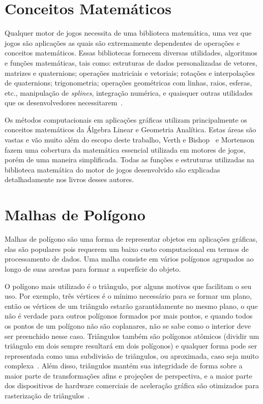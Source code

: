 \section{Conceitos Matemáticos}
\label{secmathconcepts}

Qualquer motor de jogos necessita de uma biblioteca matemática, uma vez que 
jogos são aplicações as quais são extremamente dependentes de operações e 
conceitos matemáticos. 
Essas bibliotecas fornecem diversas utilidades, algoritmos e funções 
matemáticas, tais como: estruturas de dados personalizadas de vetores, 
matrizes e quaternions; operações matriciais e vetoriais; rotações e 
interpolações de quaternions; trigonometria; operações geométricas com 
linhas, raios, esferas, etc., manipulação de \textit{splines}, integração 
numérica, e quaisquer outras utilidades que os desenvolvedores 
necessitarem~\cite{gregory2009game}.

Os métodos computacionais em aplicações gráficas utilizam principalmente os conceitos 
matemáticos da Álgebra Linear e Geometria Analítica. Estas áreas são vastas e vão
muito além do escopo deste trabalho, Verth e Bishop~\cite{Verth:2008} e 
Mortenson~\cite{mortenson1999mathematics} fazem uma 
cobertura da matemática essencial utilizada em motores de jogos, porém de uma maneira 
simplificada. Todas as funções e estruturas utilizadas na biblioteca matemática do motor 
de jogos desenvolvido são explicadas detalhadamente nos livros desses autores.

\section{Malhas de Polígono}

Malhas de polígono são uma forma de representar objetos em aplicações gráficas, elas são 
populares pois requerem um baixo custo computacional em termos de processamento de 
dados. Uma malha consiste em vários 
polígonos agrupados ao longo de suas arestas para formar a superfície do objeto. 

O polígono mais utilizado é o triângulo, por alguns motivos que facilitam o seu uso. 
Por exemplo, três vértices é o mínimo necessário para se formar um plano, então os 
vértices de um triângulo estarão garantidamente no mesmo plano, o que não é verdade 
para outros polígonos formados por mais pontos, e quando todos os pontos de um polígono 
não são coplanares, não se sabe como o interior deve ser preenchido nesse caso. 
Triângulos também são polígonos atômicos (dividir um triângulo em dois sempre resultará 
em dois polígonos) e qualquer forma pode ser representada como uma subdivisão de 
triângulos, ou aproximada, caso seja muito complexa~\cite{hughes2014computer}.
Além disso, triângulos mantém sua integridade de forma sobre a maior parte de 
transformações afins e projeções de perspectiva, e a maior parte dos dispositivos de 
hardware comerciais de aceleração gráfica são otimizados para rasterização de 
triângulos~\cite{gregory2009game}.

